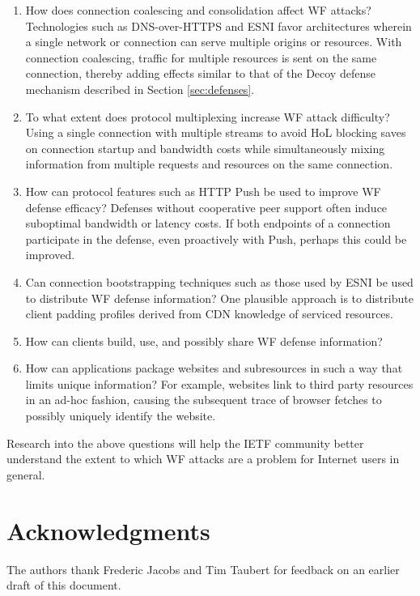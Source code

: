 \documentclass[runningheads]{llncs}
\begin{document}
\begin{enumerate}
\item How does connection coalescing and consolidation affect WF attacks? Technologies such as DNS-over-HTTPS
and ESNI favor architectures wherein a single network or connection can serve multiple origins or resources.
With connection coalescing, traffic for multiple resources is sent on the same connection, thereby adding
effects similar to that of the Decoy defense mechanism described in Section \ref{sec:defenses}.
\item To what extent does protocol multiplexing increase WF attack difficulty? Using a single connection
with multiple streams to avoid HoL blocking saves on connection startup and bandwidth costs while simultaneously
mixing information from multiple requests and resources on the same connection.
\item How can protocol features such as HTTP Push be used to improve WF defense efficacy? Defenses without
cooperative peer support often induce suboptimal bandwidth or latency costs. If both endpoints of a connection
participate in the defense, even proactively with Push, perhaps this could be improved.
\item Can connection bootstrapping techniques such as those used by ESNI be used to distribute WF defense
information? One plausible approach is to distribute client padding profiles derived from CDN knowledge
of serviced resources.
\item How can clients build, use, and possibly share WF defense information?
\item How can applications package websites and subresources in such a way that limits unique information?
For example, websites link to third party resources in an ad-hoc fashion, causing the subsequent trace of
browser fetches to possibly uniquely identify the website.
\end{enumerate}

Research into the above questions will help the IETF community better understand the extent to which
WF attacks are a problem for Internet users in general.

\section{Acknowledgments}
The authors thank Frederic Jacobs and Tim Taubert for feedback on an earlier draft of this document.



\end{document}
